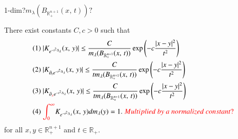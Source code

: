 \documentclass[12pt]{amsart}
\begin{document}
{\color{red}1-dim?$m_\lambda(B_{\mathbb{R}_+^{n+1}}(x,\,t))?$}
\begin{lemma}\label{heat kernel}
There exist constants $C,c>0$  such that
\begin{align*}
&(1) \ |K_{e^{-t^2 \Delta_\lambda}}(x,\,y)|\leq \frac{C}{m_\lambda(B_{\mathbb{R}_+^{n+1}}(x,\,t))}\exp\left(-c\frac{|x-y|^2}{t^2}\right)\\
&(2) \ |K_{\partial_t e^{-t^2 \Delta_\lambda} }(x,\,y)|\leq \frac{C}{tm_\lambda(B_{\mathbb{R}_+^{n+1}}(x,\,t))}\exp\left(-c\frac{|x-y|^2}{t^2}\right)\\
&(3) \ |K_{\partial_{{\color{red}x}} e^{-t^2 \Delta_\lambda} }(x,\,y)|\leq \frac{C}{tm_\lambda(B_{\mathbb{R}_+^{n+1}}(x,\,t))}\exp\left(-c\frac{|x-y|^2}{t^2}\right)\\
&(4) \ {\color{red}\int_{0}^\infty}K_{e^{-t^2 \Delta_\lambda}}(x,\,y)dm_\lambda(y)=1.{\color{red}\ Multiplied\ by\ a\ normalized\ constant?}
\end{align*}
for all $x,y\in\mathbb{R}_+^{n+1}$ and $t\in\mathbb{R}_+$.
\end{lemma}
\end{document}
